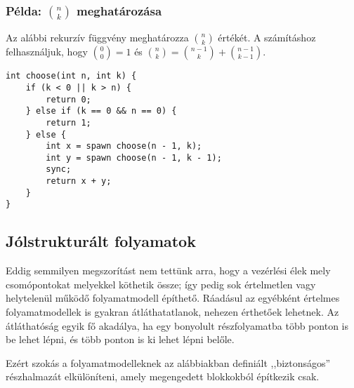 \subsubsection{Példa: $n \choose k$ meghatározása}

Az alábbi rekurzív függvény meghatározza $n \choose k$ értékét. A számításhoz felhasználjuk, hogy ${0 \choose 0} = 1$ és ${n \choose k} = {n-1 \choose k} + {n-1 \choose k-1}$.


\begin{minipage}{\balhasab}
\begin{lstlisting}
int choose(int n, int k) {
	if (k < 0 || k > n) {
		return 0;
	} else if (k == 0 && n == 0) {
		return 1;
	} else {
		int x = spawn choose(n - 1, k);
		int y = spawn choose(n - 1, k - 1);
		sync;
		return x + y;
	}
}
\end{lstlisting}
\end{minipage}
\begin{minipage}{\jobbhasab}
\end{minipage}




\subsection{Jólstrukturált folyamatok}\label{sec:jolstrukturalt-folyamatok}

Eddig semmilyen megszorítást nem tettünk arra, hogy a vezérlési élek mely csomópontokat melyekkel köthetik össze; így pedig sok értelmetlen vagy helytelenül működő folyamatmodell építhető. Ráadásul az egyébként értelmes folyamatmodellek is gyakran átláthatatlanok, nehezen érthetőek lehetnek. Az átláthatóság egyik fő akadálya, ha egy bonyolult részfolyamatba több ponton is be lehet lépni, és több ponton is ki lehet lépni belőle.

Ezért szokás a folyamatmodelleknek az alábbiakban definiált ,,biztonságos'' részhalmazát elkülöníteni, amely megengedett blokkokból építkezik csak.


